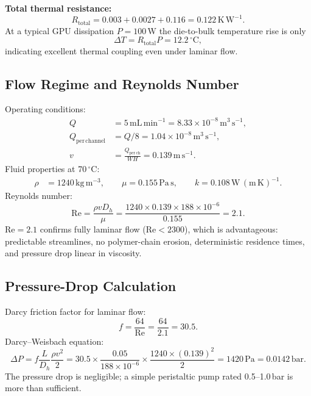 \documentclass[11pt,a4paper]{article}
\begin{document}
\textbf{Total thermal resistance:}
\begin{equation}
R_{\mathrm{total}}=0.003+0.0027+0.116=0.122\,\mathrm{K\,W^{-1}}.
\end{equation}
At a typical GPU dissipation $P=100$\,W the die-to-bulk temperature rise is only
\begin{equation}
\Delta T=R_{\mathrm{total}}P=12.2\,^\circ\mathrm{C},
\end{equation}
indicating excellent thermal coupling even under laminar flow.

\subsection{Flow Regime and Reynolds Number}
Operating conditions:
\begin{align*}
Q &= 5\,\mathrm{mL\,min^{-1}}=8.33\times10^{-8}\,\mathrm{m^3\,s^{-1}},\\
Q_{\mathrm{per\,channel}} &= Q/8=1.04\times10^{-8}\,\mathrm{m^3\,s^{-1}},\\
v &= \frac{Q_{\mathrm{per\,ch}}}{WH}=0.139\,\mathrm{m\,s^{-1}}.
\end{align*}
Fluid properties at 70\,$^\circ$C:
\begin{align*}
\rho &= 1240\,\mathrm{kg\,m^{-3}},\qquad
\mu=0.155\,\mathrm{Pa\,s},\qquad
k=0.108\,\mathrm{W\,(m\,K)^{-1}}.
\end{align*}
Reynolds number:
\begin{equation}
\mathrm{Re}=\frac{\rho v D_h}{\mu}
=\frac{1240\times0.139\times188\times10^{-6}}{0.155}=2.1.
\label{eq:re_calc}
\end{equation}
$\mathrm{Re}=2.1$ confirms fully laminar flow ($\mathrm{Re}<2300$), which is advantageous: predictable streamlines, no polymer-chain erosion, deterministic residence times, and pressure drop linear in viscosity.

\subsection{Pressure-Drop Calculation}
Darcy friction factor for laminar flow:
\begin{equation}
f=\frac{64}{\mathrm{Re}}=\frac{64}{2.1}=30.5.
\label{eq:darcy_friction}
\end{equation}
Darcy--Weisbach equation:
\begin{equation}
\Delta P=f\frac{L}{D_h}\frac{\rho v^2}{2}
=30.5\times\frac{0.05}{188\times10^{-6}}\times\frac{1240\times(0.139)^2}{2}
=1420\,\mathrm{Pa}=0.0142\,\mathrm{bar}.
\label{eq:pressure_drop}
\end{equation}
The pressure drop is negligible; a simple peristaltic pump rated 0.5--1.0\,bar is more than sufficient.
\end{document}
